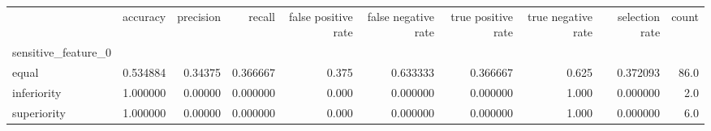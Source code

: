 \begin{tabular}{lrrrrrrrrr}
\toprule
{} &  accuracy &  precision &    recall &  false positive rate &  false negative rate &  true positive rate &  true negative rate &  selection rate &  count \\
sensitive\_feature\_0 &           &            &           &                      &                      &                     &                     &                 &        \\
\midrule
equal               &  0.534884 &    0.34375 &  0.366667 &                0.375 &             0.633333 &            0.366667 &               0.625 &        0.372093 &   86.0 \\
inferiority         &  1.000000 &    0.00000 &  0.000000 &                0.000 &             0.000000 &            0.000000 &               1.000 &        0.000000 &    2.0 \\
superiority         &  1.000000 &    0.00000 &  0.000000 &                0.000 &             0.000000 &            0.000000 &               1.000 &        0.000000 &    6.0 \\
\bottomrule
\end{tabular}
